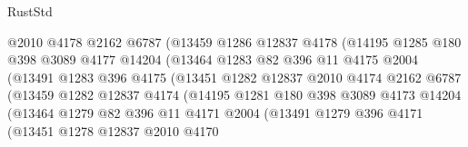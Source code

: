 \begin{lexlean}{RustStd}
\begin{coremodule}
                            @2010
                            @4178
                            @2162
                            @6787
                            (@13459
                              @1286
                              @12837
                              @4178
                              (@14195
                                @1285
                                @180
                                @398
                                @3089
                                @4177
                                @14204
                                (@13464
                                  @1283
                                  @82
                                  @396
                                  @11
                                  @4175
                                  @2004
                                  (@13491
                                    @1283
                                    @396
                                    @4175
                                    (@13451
                                      @1282
                                      @12837
                                      @2010
                                      @4174
                                      @2162
                                      @6787
                                      (@13459
                                        @1282
                                        @12837
                                        @4174
                                        (@14195
                                          @1281
                                          @180
                                          @398
                                          @3089
                                          @4173
                                          @14204
                                          (@13464
                                            @1279
                                            @82
                                            @396
                                            @11
                                            @4171
                                            @2004
                                            (@13491
                                              @1279
                                              @396
                                              @4171
                                              (@13451
                                                @1278
                                                @12837
                                                @2010
                                                @4170

\end{coremodule}
\end{lexlean}
